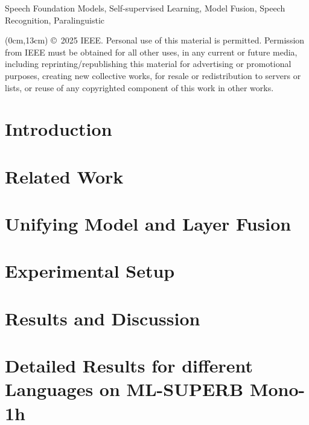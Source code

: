 \documentclass[conference]{IEEEtran}
\begin{document}
\begin{IEEEkeywords}
Speech Foundation Models, Self-supervised Learning, Model Fusion, Speech Recognition, Paralinguistic
\end{IEEEkeywords}

\begin{textblock*}{\textwidth}(0cm,13cm)
\tiny
\noindent
\copyright~2025 IEEE.  Personal use of this material is permitted. Permission from IEEE must be obtained for all other uses, in any current or future media, including reprinting/republishing this material for advertising or promotional purposes, creating new collective works, for resale or redistribution to servers or lists, or reuse of any copyrighted component of this work in other works.
\end{textblock*}

\section{Introduction}


\section{Related Work}


\section{Unifying Model and Layer Fusion}




\vspace{-10pt}
\section{Experimental Setup}



\section{Results and Discussion}


\section{Detailed Results for different Languages on ML-SUPERB Mono-1h}

\end{document}

